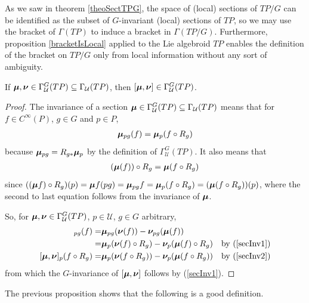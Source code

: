 As we saw in theorem \ref{theoSectTPG}, the space of (local) sections of $TP/G$ can be identified as the subset of $G$-invariant (local) sections of $TP$, so we may use the bracket of $\Gamma(TP)$ to induce a bracket in $\Gamma(TP/G)$. Furthermore, proposition \ref{bracketIsLocal} applied to the Lie algebroid $TP$ enables the definition of the bracket on $TP/G$ only from local information without any sort of ambiguity.

\begin{lemma}
If $\bm{\mu}, \bm{\nu} \in \Gamma_{\mathcal U}^G(TP) \subseteq \Gamma_{\mathcal U}(TP)$, then $[\bm{\mu}, \bm{\nu}] \in \Gamma_{\mathcal U}^G(TP)$.
\end{lemma}

\begin{proof}
The invariance of a section $\bm{\mu} \in \Gamma_{\mathcal U}^G(TP) \subseteq \Gamma_{\mathcal U}(TP)$ means that for $f \in C^\infty(P)$, $g \in G$ and $p \in P$,  
\begin{align} \label{secInv1}
\bm{\mu}_{pg} (f) = \bm{\mu}_p(f \circ R_g)\end{align} 
because $\bm{\mu}_{pg} = R_{g*} \bm{\mu}_p$ by the definition of $\Gamma_{\mathcal U}^G(TP)$. It also means that 
\begin{align}\label{secInv2}
(\bm{\mu} (f)) \circ R_g = \bm{\mu}(f \circ R_g)
\end{align}
since $((\bm{\mu} f) \circ R_g)(p) = \bm{\mu} f(pg) = \bm{\mu}_{pg} f = \bm{\mu}_p(f \circ R_g) = (\bm{\mu}(f \circ R_g))(p)$, where the second to last equation follows from the invariance of $\bm{\mu}$.
    
So, for $\bm{\mu}, \bm{\nu} \in \Gamma_{\mathcal U}^G(TP)$, $p \in \mathcal U$, $g \in G$ arbitrary,
\begin{align*}
    [\sect \mu, \sect \nu]_{pg}(f)
        =& \sect \mu_{pg}(\sect \nu(f)) - \sect \nu_{pg}(\sect \mu (f))\\
        =& \sect \mu_{p}(\sect \nu(f) \circ R_g) - \sect \nu_{p}(\sect \mu (f) \circ R_g) & \textrm{by } (\ref{secInv1})\\
    [\sect \mu, \sect \nu]_p (f \circ R_g) =& \sect \mu_p(\sect \nu(f \circ R_g)) - \sect \nu_p(\sect \mu(f \circ R_g)) & \textrm{by } (\ref{secInv2})
\end{align*}
from which the $G$-invariance of $[\bm{\mu}, \bm{\nu}]$ follows by (\ref{secInv1}).
\end{proof}

The previous proposition shows that the following is a good definition.

